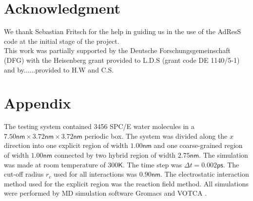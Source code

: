 \documentclass[aps,pre,preprint]{revtex4}
\begin{document}
\section{Acknowledgment}
We thank Sebastian Fritsch for the help in guiding us in the use of the AdResS code at the initial stage of the project.\\ 
This work was partially supported by the Deutsche Forschungsgemeinschaft (DFG) with the Heisenberg grant provided to L.D.S (grant code DE 1140/5-1) and by......provided to H.W and C.S.

\section{Appendix}
The testing system contained 3456 SPC/E \cite{berendsen1987missing}
water molecules in a $7.50\textsf{nm}\times 3.72\textsf{nm}\times
3.72\textsf{nm}$ periodic box. The system was divided along the $x$ direction
into one explicit region of width $1.00\textsf{nm}$ and one
coarse-grained region of width $1.00\textsf{nm}$ connected by two
hybrid region of width $2.75\textsf{nm}$. The simulation was made at
room temperature of $300\textsf{K}$. The time step was $\Delta t =
0.002\textsf{ps}$. The cut-off radius $r_{c}$ used for all interactions was
$0.90\textsf{nm}$. The electrostatic interaction method used for the
explicit region was the reaction field method. All simulations were
performed by MD simulation software Gromacs \cite{gromacs}
and VOTCA \cite{ruehle2009versatile}.




{}

\end{document}
